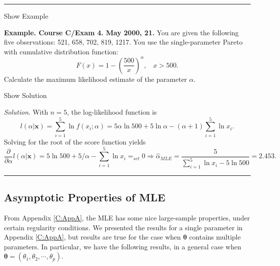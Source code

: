 \documentclass[]{book}
\theoremstyle{definition}
\theoremstyle{definition}
\theoremstyle{definition}
\theoremstyle{remark}
\begin{document}
\begin{center}\rule{0.5\linewidth}{\linethickness}\end{center}

Show Example

\hypertarget{EXM:S2b:MLE}{}
\textbf{Example. Course C/Exam 4. May 2000, 21.} You are given the
following five observations: 521, 658, 702, 819, 1217. You use the
single-parameter Pareto with cumulative distribution function:
\[F(x) = 1- \left(\frac{500}{x}\right)^{\alpha}, ~~~~ x>500 .\]
Calculate the maximum likelihood estimate of the parameter \(\alpha\).

Show Solution

\hypertarget{SOL:S2b:MLE}{}
\emph{Solution}. With \(n=5\), the log-likelihood function is
\[l(\alpha|\mathbf{x} ) =  \sum_{i=1}^5 \ln f(x_i;\alpha ) =  5 \alpha \ln 500 + 5 \ln \alpha
-(\alpha+1) \sum_{i=1}^5 \ln x_i.\] Solving for the root of the score
function yields
\[\frac{ \partial}{\partial \alpha } l(\alpha |\mathbf{x}) =    5  \ln 500 + 5 / \alpha -  \sum_{i=1}^5 \ln x_i
=_{set} 0 \Rightarrow \hat{\alpha}_{MLE} = \frac{5}{\sum_{i=1}^5 \ln x_i - 5  \ln 500 } = 2.453 .\]

\begin{center}\rule{0.5\linewidth}{\linethickness}\end{center}

\subsection{Asymptotic Properties of
MLE}\label{asymptotic-properties-of-mle}

From Appendix \ref{C:AppA}, the MLE has some nice large-sample
properties, under certain regularity conditions. We presented the
results for a single parameter in Appendix \ref{C:AppA}, but results are
true for the case when \(\boldsymbol{\theta}\) contains multiple
parameters. In particular, we have the following results, in a general
case when \(\boldsymbol{\theta}=(\theta_1,\theta_2,\cdots,\theta_p)\).
\end{document}
